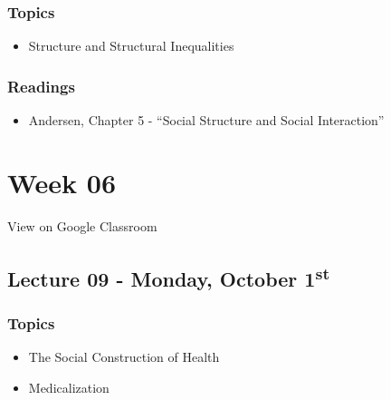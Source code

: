 \documentclass[]{book}
\providecommand{\tightlist}{%
  \setlength{\itemsep}{0pt}\setlength{\parskip}{0pt}}
\theoremstyle{definition}
\theoremstyle{definition}
\theoremstyle{definition}
\theoremstyle{remark}
\begin{document}
\hypertarget{topics-9}{%
\subsubsection*{Topics}\label{topics-9}}

\begin{itemize}
\tightlist
\item
  Structure and Structural Inequalities
\end{itemize}

\hypertarget{readings-8}{%
\subsubsection*{Readings}\label{readings-8}}

\begin{itemize}
\tightlist
\item
  Andersen, Chapter 5 - ``Social Structure and Social Interaction''
\end{itemize}

\hypertarget{week-06}{%
\section*{Week 06}\label{week-06}}

View on Google Classroom

\hypertarget{lecture-09---monday-october-1st}{%
\subsection*{\texorpdfstring{Lecture 09 - Monday, October
1\textsuperscript{st}}{Lecture 09 - Monday, October 1st}}\label{lecture-09---monday-october-1st}}

\hypertarget{topics-10}{%
\subsubsection*{Topics}\label{topics-10}}

\begin{itemize}
\tightlist
\item
  The Social Construction of Health
\item
  Medicalization
\end{itemize}
\end{document}
